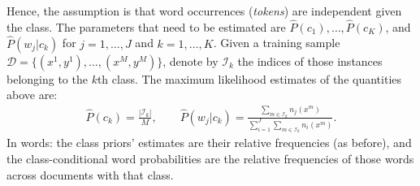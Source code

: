 Hence, the assumption is that word occurrences (\emph{tokens}) are independent given the class. 
The parameters that need to be estimated are ${\hat P}(c_1),\ldots,{\hat P}(c_K)$, and ${\hat P}(w_j|c_k)$ for $j=1,\ldots,J$ and $k=1,\ldots,K$. 
Given a training sample $\mathcal{D} = \{(x^{1},y^{1}),\ldots,(x^{M},y^{M})\}$, 
denote by $\mathcal{I}_k$ the indices of those instances belonging to the $k$th class. 
The maximum likelihood estimates of the quantities above are: 
\begin{eqnarray}\label{eq:mlemultinomial}
{\hat P}(c_k) = \frac{|\mathcal{I}_k|}{M}, \qquad
{\hat P}(w_j|c_k) = \frac{\sum_ {m \in \mathcal{I}_k} n_j(x^m)}{\sum_{i=1}^J \sum_ {m\in \mathcal{I}_k} n_i(x^m)}.
\end{eqnarray}
In words: the class priors' estimates are their relative frequencies (as before), and 
the class-conditional word probabilities are the relative frequencies of those words across documents with that class.




